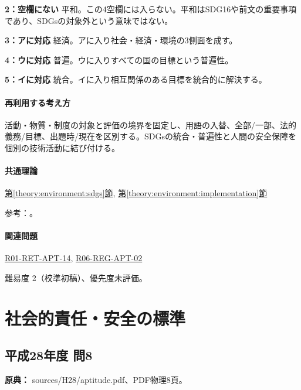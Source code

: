 \noindent\textbf{2：空欄にない} 平和。この4空欄には入らない。平和はSDG16や前文の重要事項であり、SDGsの対象外という意味ではない。\par

\noindent\textbf{3：アに対応} 経済。アに入り社会・経済・環境の3側面を成す。\par

\noindent\textbf{4：ウに対応} 普遍。ウに入りすべての国の目標という普遍性。\par

\noindent\textbf{5：イに対応} 統合。イに入り相互関係のある目標を統合的に解決する。\par

\paragraph{再利用する考え方} 活動・物質・制度の対象と評価の境界を固定し、用語の入替、全部/一部、法的義務/目標、出題時/現在を区別する。SDGsの統合・普遍性と人間の安全保障を個別の技術活動に結び付ける。

\paragraph{共通理論} \hyperref[theory:environment:sdgs]{第\ref*{theory:environment:sdgs}節}, \hyperref[theory:environment:implementation]{第\ref*{theory:environment:implementation}節}

\par 参考：\cite{env_sdgs_pamphlet,env_humansecurity}。

\paragraph{関連問題} \hyperref[q:r01-ret-apt-14]{R01-RET-APT-14}, \hyperref[q:r06-reg-apt-02]{R06-REG-APT-02}

\par 難易度 2（校準初稿）、優先度未評価。

\section{社会的責任・安全の標準}

\subsection{平成28年度 問8}
\label{q:h28-reg-apt-08}

\noindent\textbf{原典：} sources/H28/aptitude.pdf、PDF物理8頁。


